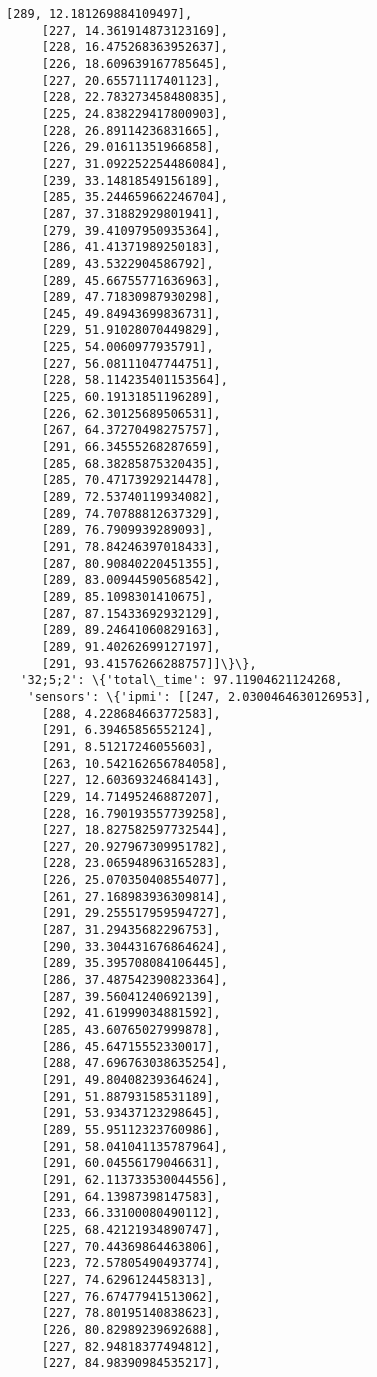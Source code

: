 \documentclass[11pt]{article}
\begin{document}
\begin{tcolorbox}[breakable, size=fbox, boxrule=.5pt, pad at break*=1mm, opacityfill=0]
\begin{Verbatim}[commandchars=\\\{\}]
     [289, 12.181269884109497],
     [227, 14.361914873123169],
     [228, 16.475268363952637],
     [226, 18.609639167785645],
     [227, 20.65571117401123],
     [228, 22.783273458480835],
     [225, 24.838229417800903],
     [228, 26.89114236831665],
     [226, 29.01611351966858],
     [227, 31.092252254486084],
     [239, 33.14818549156189],
     [285, 35.244659662246704],
     [287, 37.31882929801941],
     [279, 39.41097950935364],
     [286, 41.41371989250183],
     [289, 43.5322904586792],
     [289, 45.66755771636963],
     [289, 47.71830987930298],
     [245, 49.84943699836731],
     [229, 51.91028070449829],
     [225, 54.0060977935791],
     [227, 56.08111047744751],
     [228, 58.114235401153564],
     [225, 60.19131851196289],
     [226, 62.30125689506531],
     [267, 64.37270498275757],
     [291, 66.34555268287659],
     [285, 68.38285875320435],
     [285, 70.47173929214478],
     [289, 72.53740119934082],
     [289, 74.70788812637329],
     [289, 76.7909939289093],
     [291, 78.84246397018433],
     [287, 80.90840220451355],
     [289, 83.00944590568542],
     [289, 85.1098301410675],
     [287, 87.15433692932129],
     [289, 89.24641060829163],
     [289, 91.40262699127197],
     [291, 93.41576266288757]]\}\},
  '32;5;2': \{'total\_time': 97.11904621124268,
   'sensors': \{'ipmi': [[247, 2.0300464630126953],
     [288, 4.228684663772583],
     [291, 6.39465856552124],
     [291, 8.51217246055603],
     [263, 10.542162656784058],
     [227, 12.60369324684143],
     [229, 14.71495246887207],
     [228, 16.790193557739258],
     [227, 18.827582597732544],
     [227, 20.927967309951782],
     [228, 23.065948963165283],
     [226, 25.070350408554077],
     [261, 27.168983936309814],
     [291, 29.255517959594727],
     [287, 31.29435682296753],
     [290, 33.304431676864624],
     [289, 35.395708084106445],
     [286, 37.487542390823364],
     [287, 39.56041240692139],
     [292, 41.61999034881592],
     [285, 43.60765027999878],
     [286, 45.64715552330017],
     [288, 47.696763038635254],
     [291, 49.80408239364624],
     [291, 51.88793158531189],
     [291, 53.93437123298645],
     [289, 55.95112323760986],
     [291, 58.041041135787964],
     [291, 60.04556179046631],
     [291, 62.113733530044556],
     [291, 64.13987398147583],
     [233, 66.33100080490112],
     [225, 68.42121934890747],
     [227, 70.44369864463806],
     [223, 72.57805490493774],
     [227, 74.6296124458313],
     [227, 76.67477941513062],
     [227, 78.80195140838623],
     [226, 80.82989239692688],
     [227, 82.94818377494812],
     [227, 84.98390984535217],

\end{Verbatim}
\end{tcolorbox}
\end{document}
